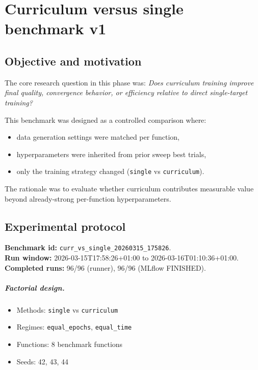 \chapter{Curriculum versus single benchmark v1}
\label{app:curr-vs-single-v1}

\section{Objective and motivation}

The core research question in this phase was:
\emph{Does curriculum training improve final quality, convergence behavior,
or efficiency relative to direct single-target training?}

This benchmark was designed as a controlled comparison where:

\begin{itemize}
    \item data generation settings were matched per function,
    \item hyperparameters were inherited from prior sweep best trials,
    \item only the training strategy changed (\texttt{single} vs \texttt{curriculum}).
\end{itemize}

The rationale was to evaluate whether curriculum contributes measurable value
beyond already-strong per-function hyperparameters.

\section{Experimental protocol}

\textbf{Benchmark id:} \texttt{curr\_vs\_single\_20260315\_175826}.\\
\textbf{Run window:} 2026-03-15T17:58:26+01:00 to 2026-03-16T01:10:36+01:00.\\
\textbf{Completed runs:} 96/96 (runner), 96/96 (MLflow FINISHED).

\paragraph{Factorial design.}

\begin{itemize}
    \item Methods: \texttt{single} vs \texttt{curriculum}
    \item Regimes: \texttt{equal\_epochs}, \texttt{equal\_time}
    \item Functions: 8 benchmark functions
    \item Seeds: 42, 43, 44
\end{itemize}

